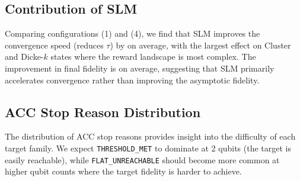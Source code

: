 \subsection{Contribution of SLM}

Comparing configurations (1) and (4), we find that SLM improves the convergence
speed (reduces $\tau$) by  on average, with the largest effect
on Cluster and Dicke-$k$ states where the reward landscape is most complex.
The improvement in final fidelity is  on average, suggesting
that SLM primarily accelerates convergence rather than improving the asymptotic
fidelity.

\subsection{ACC Stop Reason Distribution}


The distribution of ACC stop reasons provides insight into the difficulty of each
target family. We expect \texttt{THRESHOLD\_MET} to dominate at 2 qubits (the
target is easily reachable), while \texttt{FLAT\_UNREACHABLE} should become more
common at higher qubit counts where the target fidelity is harder to achieve.
